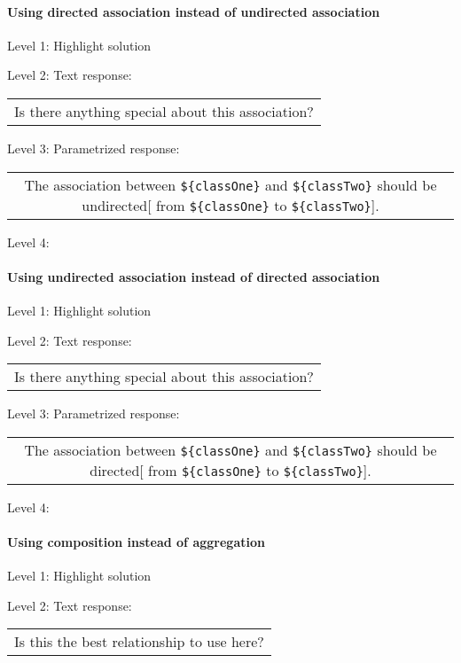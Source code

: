 \paragraph{Using directed association instead of undirected association}

\noindent Level 1: Highlight solution \medskip

\noindent Level 2: Text response: \medskip

\begin{tabular}{|c}
Is there anything special about this association?
\end{tabular} \medskip

\noindent Level 3: Parametrized response: \medskip

\begin{tabular}{|c}
The association between \verb|${classOne}| and \verb|${classTwo}| should be undirected[ from \verb|${classOne}| to \verb|${classTwo}|].
\end{tabular} \medskip

\noindent Level 4: 
\paragraph{Using undirected association instead of directed association}

\noindent Level 1: Highlight solution \medskip

\noindent Level 2: Text response: \medskip

\begin{tabular}{|c}
Is there anything special about this association?
\end{tabular} \medskip

\noindent Level 3: Parametrized response: \medskip

\begin{tabular}{|c}
The association between \verb|${classOne}| and \verb|${classTwo}| should be directed[ from \verb|${classOne}| to \verb|${classTwo}|].
\end{tabular} \medskip

\noindent Level 4: 
\paragraph{Using composition instead of aggregation}

\noindent Level 1: Highlight solution \medskip

\noindent Level 2: Text response: \medskip

\begin{tabular}{|c}
Is this the best relationship to use here?
\end{tabular} \medskip


